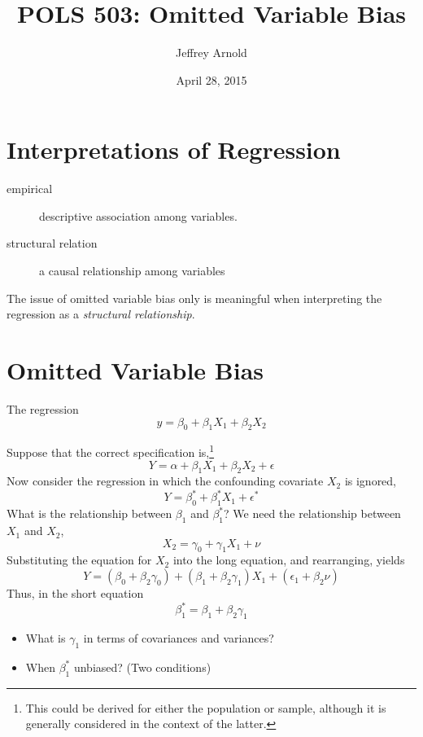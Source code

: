 \documentclass{tufte-handout}
\title{POLS 503: Omitted Variable Bias}
\author{Jeffrey Arnold}
\date{April 28, 2015}
\begin{document}
\maketitle



\section{Interpretations of
Regression}\label{interpretations-of-regression}

\begin{description}
\item[empirical]
descriptive association among variables.
\item[structural relation]
a causal relationship among variables
\end{description}

The issue of omitted variable bias only is meaningful when interpreting
the regression as a \emph{structural relationship}.

\section{Omitted Variable Bias}\label{omitted-variable-bias}

The regression \[
y = \beta_0 + \beta_1 X_1 + \beta_2 X_2
\]

Suppose that the correct specification is,\footnote{This could be
  derived for either the population or sample, although it is generally
  considered in the context of the latter.} \[
Y = \alpha + \beta_1 X_1 + \beta_2 X_2 + \epsilon
\] Now consider the regression in which the confounding covariate
\(X_2\) is ignored, \[
Y = \beta^*_0 + \beta^*_1 X_1 + \epsilon^*
\] What is the relationship between \(\beta_1\) and \(\beta^*_1\)? We
need the relationship between \(X_1\) and \(X_2\), \[
X_2 = \gamma_0 + \gamma_1 X_1 + \nu
\] Substituting the equation for \(X_2\) into the long equation, and
rearranging, yields \[
Y = (\beta_0 + \beta_2 \gamma_0) + (\beta_1 + \beta_2 \gamma_1) X_1 + (\epsilon_1 + \beta_2 \nu)
\] Thus, in the short equation \[
\beta^*_1 = \beta_1 + \beta_2 \gamma_1
\]

\begin{itemize}
\itemsep1pt\parskip0pt
\item
  What is \(\gamma_1\) in terms of covariances and variances?
\item
  When \(\beta^*_1\) unbiased? (Two conditions)
\end{itemize}
\end{document}
